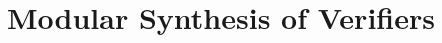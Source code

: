 \documentclass[10pt,conference]{IEEEtran}
\begin{document}
\section{Modular Synthesis of Verifiers}\label{sec:Syn}
\end{document}

